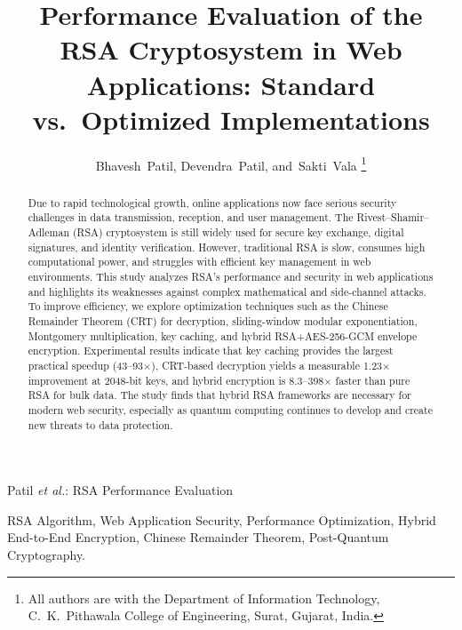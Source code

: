 \documentclass[journal]{IEEEtran}
\begin{document}
\title{Performance Evaluation of the RSA Cryptosystem in Web Applications: Standard vs.\ Optimized Implementations}

\author{
Bhavesh~Patil,
Devendra~Patil,
and~Sakti~Vala%
\thanks{All authors are with the Department of Information Technology,
C.~K.~Pithawala College of Engineering, Surat, Gujarat, India.}%
}

%
{Patil \MakeLowercase{\textit{et al.}}: RSA Performance Evaluation}


\maketitle

\begin{abstract}
Due to rapid technological growth, online applications now face serious security challenges in data transmission, reception, and user management. The Rivest--Shamir--Adleman (RSA) cryptosystem is still widely used for secure key exchange, digital signatures, and identity verification. However, traditional RSA is slow, consumes high computational power, and struggles with efficient key management in web environments. This study analyzes RSA's performance and security in web applications and highlights its weaknesses against complex mathematical and side-channel attacks. To improve efficiency, we explore optimization techniques such as the Chinese Remainder Theorem (CRT) for decryption, sliding-window modular exponentiation, Montgomery multiplication, key caching, and hybrid RSA+AES-256-GCM envelope encryption. Experimental results indicate that key caching provides the largest practical speedup (43--93$\times$), CRT-based decryption yields a measurable 1.23$\times$ improvement at 2048-bit keys, and hybrid encryption is 8.3--398$\times$ faster than pure RSA for bulk data. The study finds that hybrid RSA frameworks are necessary for modern web security, especially as quantum computing continues to develop and create new threats to data protection.
\end{abstract}

\begin{IEEEkeywords}
RSA Algorithm, Web Application Security, Performance Optimization, Hybrid End-to-End Encryption, Chinese Remainder Theorem, Post-Quantum Cryptography.
\end{IEEEkeywords}
\end{document}
